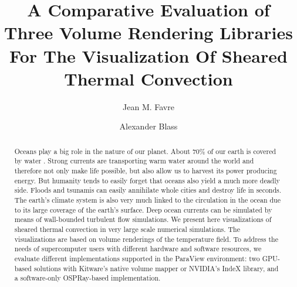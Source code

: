 \documentclass[5p,times]{elsarticle}
\begin{document}
\begin{frontmatter}



\title{A Comparative Evaluation of Three Volume Rendering Libraries For The Visualization Of Sheared Thermal Convection}


\author[CSCS]{Jean M. Favre}
\author[Twente]{Alexander Blass}

\address[CSCS]{Swiss National Supercomputing Center (CSCS), Via Trevano 131, CH-6900 Lugano, Switzerland}
\address[Twente]{Physics of Fluids Group, Max Planck Center for Complex Fluid Dynamics,
J. M. Burgers Center for Fluid Dynamics and MESA+ Research Institute,
Department of Science and Technology,
University of Twente, P.O. Box 217, 7500 AE Enschede, The Netherlands}

\begin{abstract}
Oceans play a big role in the nature of our planet. About $ 70 \% $ of our earth
is covered by water \cite{int14}. Strong currents are transporting warm water around the world
and therefore not only make life possible, but also allow us to harvest its
power producing energy. But humanity tends to easily forget that oceans also
yield a much more deadly side. Floods and tsunamis can easily annihilate whole
cities and destroy life in seconds. The earth's climate system is also very much
linked to the circulation in the ocean due to its large coverage of the earth's surface.
Deep ocean currents can be simulated by means of wall-bounded turbulent flow simulations. We present here visualizations of sheared thermal convection in very large scale numerical simulations.
The visualizations are based on volume renderings of the temperature field. To address the needs of supercomputer users
with different hardware and software resources, we evaluate different implementations
supported in the ParaView \cite{Ahrens2005} environment: two GPU-based solutions
with Kitware's native volume mapper or NVIDIA's IndeX library, and a software-only
OSPRay-based implementation.


\end{abstract}
\end{frontmatter}
\end{document}
